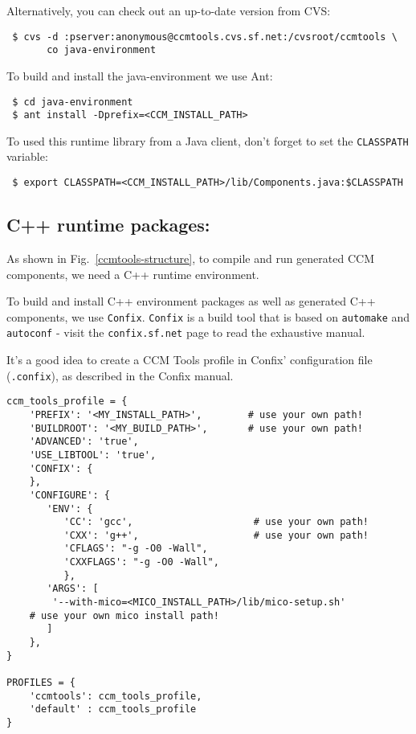 Alternatively, you can check out an up-to-date version from CVS:
\begin{small}
\begin{verbatim}
 $ cvs -d :pserver:anonymous@ccmtools.cvs.sf.net:/cvsroot/ccmtools \
       co java-environment
\end{verbatim}
\end{small}

To build and install the java-environment we use Ant:
\begin{small}
\begin{verbatim}
 $ cd java-environment
 $ ant install -Dprefix=<CCM_INSTALL_PATH>
\end{verbatim}
\end{small}

\noindent
To used this runtime library from a Java client, 
don't forget to set the {\tt CLASSPATH} variable:
\begin{small}
\begin{verbatim}
 $ export CLASSPATH=<CCM_INSTALL_PATH>/lib/Components.java:$CLASSPATH
\end{verbatim}
\end{small}



\subsection{C++ runtime packages:}
As shown in Fig.~\ref{ccmtools-structure}, to compile and run generated CCM
components, we need a C++ runtime environment.

\noindent
To build and install C++ environment packages as well as generated C++ components, 
we use {\tt Confix}. 
{\tt Confix} is a build tool that is based on {\tt automake} and 
{\tt autoconf} - visit the {\tt confix.sf.net} page to read the
exhaustive manual. 

\noindent
It's a good idea to create a CCM Tools profile in Confix' configuration file
({\tt .confix}), as described in the Confix manual.
\begin{small}
\begin{verbatim}
ccm_tools_profile = {
    'PREFIX': '<MY_INSTALL_PATH>',        # use your own path!
    'BUILDROOT': '<MY_BUILD_PATH>',       # use your own path!
    'ADVANCED': 'true',
    'USE_LIBTOOL': 'true',
    'CONFIX': {
    },
    'CONFIGURE': {
       'ENV': {
          'CC': 'gcc',                     # use your own path!
          'CXX': 'g++',                    # use your own path!    
          'CFLAGS': "-g -O0 -Wall",
          'CXXFLAGS': "-g -O0 -Wall",
          },
       'ARGS': [
        '--with-mico=<MICO_INSTALL_PATH>/lib/mico-setup.sh'
	# use your own mico install path!
       ]
    },
}

PROFILES = {
    'ccmtools': ccm_tools_profile,
    'default' : ccm_tools_profile
}
\end{verbatim}
\end{small}

